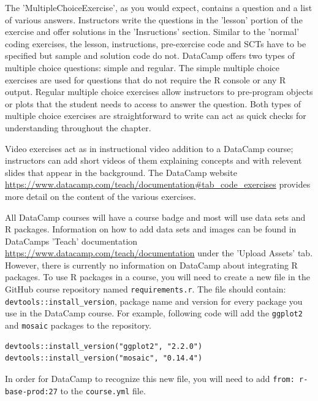 \documentclass[12pt]{article}
\begin{document}




The 'MultipleChoiceExercise', as you would expect, contains a question and a list of various answers. Instructors write the questions in the 'lesson'
portion of the exercise and offer solutions in the 'Insructions' section. Similar to the 'normal' coding exercises, the lesson, instructions, pre-exercise 
code and SCTs have to be specified but sample and solution code do not. DataCamp offers two types of multiple choice questions: simple and regular. 
The simple multiple choice exercises are used for questions that do not require the R console or any R output. Regular multiple choice exercises 
allow instructors to pre-program objects or plots that the student needs to access to answer the question. Both types of multiple choice exercises 
are straightforward to write can act as quick checks for understanding throughout the chapter.


Video exercises act as in instructional video addition to a DataCamp course; instructors can add short videos of them explaining concepts and with 
relevent slides that appear in the background. The DataCamp website \url{https://www.datacamp.com/teach/documentation#tab_code_exercises} provides 
more detail on the content of the various exercises. 


All DataCamp courses will have a course badge and most will use data sets and R packages. Information on how to add data sets and images
can be found in DataCamps 'Teach' documentation \url{https://www.datacamp.com/teach/documentation} under the 'Upload Assets' tab. However,
there is currently no information on DataCamp about integrating R packages. To use R packages in a course, you will need to create a new file
in the GitHub course repository named \texttt{requirements.r}. The file should contain: \texttt{devtools::install\_version}, package name and version for 
every package you use in the DataCamp course. For example, following code will add the \texttt{ggplot2} and \texttt{mosaic} packages to the repository.

\begin{verbatim}
devtools::install_version("ggplot2", "2.2.0")
devtools::install_version("mosaic", "0.14.4")
\end{verbatim}
In order for DataCamp to recognize this new file, you will need to add \texttt{from: r-base-prod:27} to the \texttt{course.yml} file.








%


\end{document}
